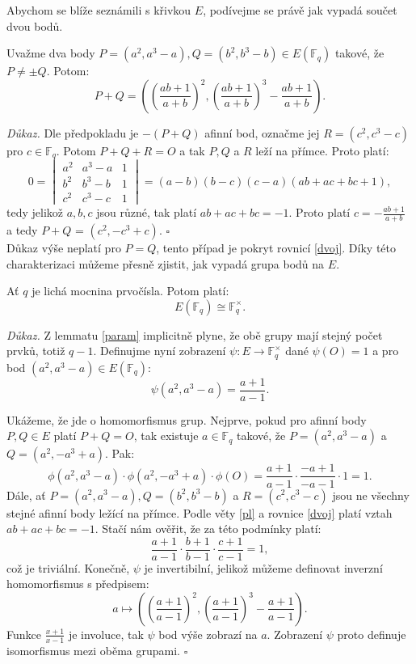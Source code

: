 \documentclass[12pt]{report}
\begin{document}
Abychom se blíže seznámili s křivkou $E$, podívejme se právě jak vypadá součet dvou bodů. 
 
\begin{veta}\label{pl}
Uvažme dva body $P = (a^2,a^3-a),Q = (b^2,b^3-b) \in E(\mathbb{F}_q)$ takové, že $P \neq \pm Q$. Potom:
$$P+Q = \left( \left(\frac{ab+1}{a+b}\right)^2, \left(\frac{ab+1}{a+b}\right)^3 -\frac{ab+1}{a+b} \right).$$
\end{veta}

\noindent \textit{Důkaz.} Dle předpokladu je $-(P+Q)$ afinní bod, označme jej $R = (c^2,c^3-c)$ pro $c \in \mathbb{F}_q$. Potom $P+Q+R=O$ a tak $P,Q$ a $R$ leží na přímce. Proto platí: 
$$0 = \begin{vmatrix}
a^2 & a^3-a & 1 \\ 
b^2 & b^3-b & 1 \\ 
c^2 & c^3-c & 1
\end{vmatrix} = (a-b)(b-c)(c-a)(ab+ac+bc +1),$$
tedy jelikož $a,b,c$ jsou různé, tak platí $ab+ac+bc=-1$. Proto platí $c = - \frac{ab+1}{a+b}$ a tedy $P+Q$ = $(c^2,-c^3+c)$. \hfill $\square$\\

Důkaz výše neplatí pro $P=Q$, tento případ je pokryt rovnicí \eqref{dvoj}. Díky této charakterizaci můžeme přesně zjistit, jak vypadá grupa bodů na $E$.
\begin{veta}\label{BRUH}
Ať $q$ je lichá mocnina prvočísla. Potom platí:
$$E(\mathbb{F}_q) \cong \mathbb{F}_q ^{\times}.$$
\end{veta}

\noindent \textit{Důkaz.} Z lemmatu \ref{param} implicitně plyne, že obě grupy mají stejný počet prvků, totiž $q-1$. Definujme nyní zobrazení $\psi : E \longrightarrow \mathbb{F}_q ^{\times}$ dané $\psi(O) = 1$ a pro bod $(a^2,a^3-a) \in E(\mathbb{F}_q)$:
$$\psi(a^2,a^3-a) = \frac{a+1}{a-1}.$$

Ukážeme, že jde o homomorfismus grup. Nejprve, pokud pro afinní body $P,Q \in E$ platí $P+Q=O$, tak existuje $a \in \mathbb{F}_q$ takové, že $P = (a^2,a^3-a)$ a $Q=(a^2,-a^3+a)$. Pak:
$$\phi(a^2,a^3-a) \cdot \phi(a^2,-a^3+a) \cdot \phi(O) = \frac{a+1}{a-1} \cdot \frac{-a+1}{-a-1} \cdot 1 = 1.$$
Dále, ať $P=(a^2,a^3-a), Q = (b^2,b^3-b)$ a $R=(c^2,c^3-c)$ jsou ne všechny stejné afinní body ležící na přímce. Podle věty \ref{pl} a rovnice \eqref{dvoj} platí vztah $ab+ac+bc=-1$. Stačí nám ověřit, že za této podmínky platí:
$$\frac{a+1}{a-1} \cdot \frac{b+1}{b-1} \cdot \frac{c+1}{c-1} = 1,$$
což je triviální. Konečně, $\psi$ je invertibilní, jelikož můžeme definovat inverzní homomorfismus s předpisem:
$$a \longmapsto \left(\left(\frac{a+1}{a-1} \right)^2, \left( \frac{a+1}{a-1} \right)^3-\frac{a+1}{a-1} \right).$$ Funkce $\frac{x+1}{x-1}$ je involuce, tak $\psi$ bod výše zobrazí na $a$. Zobrazení $\psi$ proto definuje isomorfismus mezi oběma grupami. \hfill $\square$\\
\end{document}

